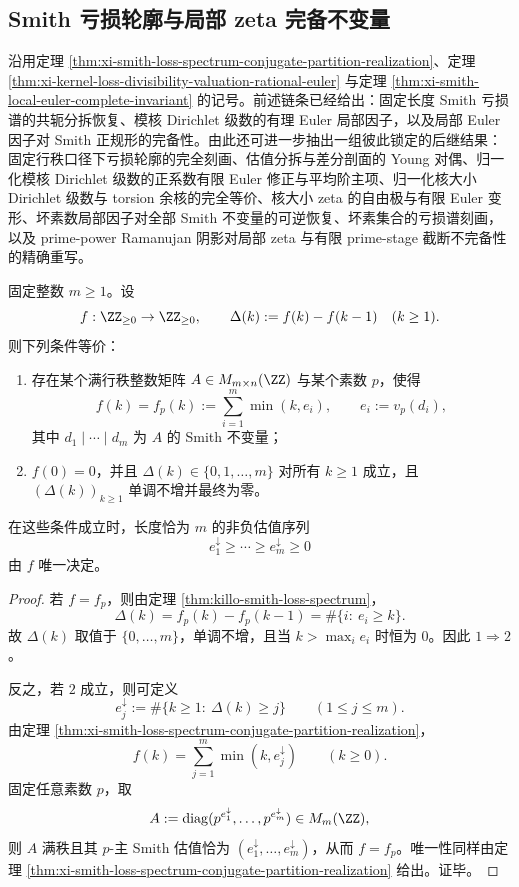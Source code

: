 \subsection{Smith 亏损轮廓与局部 zeta 完备不变量}\label{subsec:conclusion-smith-bounded-profile-local-zeta}
沿用定理 \ref{thm:xi-smith-loss-spectrum-conjugate-partition-realization}、定理 \ref{thm:xi-kernel-loss-divisibility-valuation-rational-euler} 与定理 \ref{thm:xi-smith-local-euler-complete-invariant} 的记号。前述链条已经给出：固定长度 Smith 亏损谱的共轭分拆恢复、模核 Dirichlet 级数的有理 Euler 局部因子，以及局部 Euler 因子对 Smith 正规形的完备性。由此还可进一步抽出一组彼此锁定的后继结果：固定行秩口径下亏损轮廓的完全刻画、估值分拆与差分剖面的 Young 对偶、归一化模核 Dirichlet 级数的正系数有限 Euler 修正与平均阶主项、归一化核大小 Dirichlet 级数与 torsion 余核的完全等价、核大小 zeta 的自由极与有限 Euler 变形、坏素数局部因子对全部 Smith 不变量的可逆恢复、坏素集合的亏损谱刻画，以及 prime-power Ramanujan 阴影对局部 zeta 与有限 prime-stage 截断不完备性的精确重写。

\begin{theorem}\label{thm:conclusion-smith-bounded-rank-loss-profile-characterization}
固定整数 \(m\ge 1\)。设
\[
f:\ZZ_{\ge 0}\to \ZZ_{\ge 0},
\qquad
\Delta(k):=f(k)-f(k-1)\quad(k\ge 1).
\]
则下列条件等价：
\begin{enumerate}
  \item 存在某个满行秩整数矩阵 \(A\in M_{m\times n}(\ZZ)\) 与某个素数 \(p\)，使得
  \[
  f(k)=f_p(k):=\sum_{i=1}^{m}\min(k,e_i),
  \qquad
  e_i:=v_p(d_i),
  \]
  其中 \(d_1\mid\cdots\mid d_m\) 为 \(A\) 的 Smith 不变量；
  \item \(f(0)=0\)，并且 \(\Delta(k)\in\{0,1,\dots,m\}\) 对所有 \(k\ge 1\) 成立，且 \((\Delta(k))_{k\ge 1}\) 单调不增并最终为零。
\end{enumerate}
在这些条件成立时，长度恰为 \(m\) 的非负估值序列
\[
e_1^\downarrow\ge\cdots\ge e_m^\downarrow\ge 0
\]
由 \(f\) 唯一决定。
\end{theorem}
\begin{proof}
若 \(f=f_p\)，则由定理 \ref{thm:killo-smith-loss-spectrum}，
\[
\Delta(k)=f_p(k)-f_p(k-1)=\#\{i:\ e_i\ge k\}.
\]
故 \(\Delta(k)\) 取值于 \(\{0,\dots,m\}\)，单调不增，且当 \(k>\max_i e_i\) 时恒为 \(0\)。因此 \(1\Rightarrow 2\)。

反之，若 \(2\) 成立，则可定义
\[
e_j^\downarrow:=\#\{k\ge 1:\ \Delta(k)\ge j\}
\qquad(1\le j\le m).
\]
由定理 \ref{thm:xi-smith-loss-spectrum-conjugate-partition-realization}，
\[
f(k)=\sum_{j=1}^{m}\min(k,e_j^\downarrow)
\qquad(k\ge 0).
\]
固定任意素数 \(p\)，取
\[
A:=\operatorname{diag}(p^{e_1^\downarrow},\dots,p^{e_m^\downarrow})\in M_m(\ZZ),
\]
则 \(A\) 满秩且其 \(p\)-主 Smith 估值恰为 \((e_1^\downarrow,\dots,e_m^\downarrow)\)，从而 \(f=f_p\)。唯一性同样由定理 \ref{thm:xi-smith-loss-spectrum-conjugate-partition-realization} 给出。证毕。
\end{proof}

